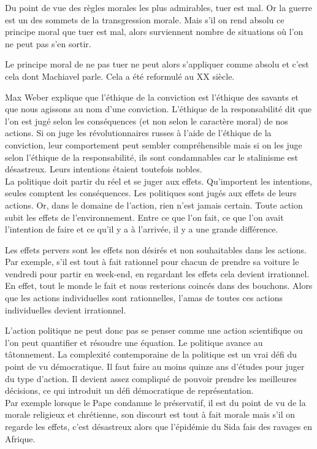 \documentclass[a4paper,11pt]{article}
\begin{document}
	Du point de vue des règles morales les plus admirables, tuer est mal. Or la guerre est un des sommets de la transgression morale. Mais s’il on rend absolu ce principe moral que tuer est mal, alors surviennent nombre de situations où l’on ne peut pas s’en sortir.
	 
	Le principe moral de ne pas tuer ne peut alors s’appliquer comme absolu et c’est cela dont Machiavel parle. Cela a été reformulé au XX siècle.
	
	Max Weber explique que l’éthique de la conviction est l’éthique des savants et que nous agissons au nom d’une conviction. L’éthique de la responsabilité dit que l’on est jugé selon les conséquences (et non selon le caractère moral) de nos actions.
	Si on juge les révolutionnaires russes à l’aide de l’éthique de la conviction, leur comportement peut sembler compréhensible mais si on les juge selon l’éthique de la responsabilité, ils sont condamnables car le stalinisme est désastreux. Leurs intentions étaient toutefois nobles.\\

	
	La politique doit partir du réel et se juger aux effets. Qu’importent les intentions, seules comptent les conséquences. Les politiques sont jugés aux effets de leurs actions. Or, dans le domaine de l’action, rien n’est jamais certain. Toute action subit les effets de l’environnement. Entre ce que l’on fait, ce que l’on avait l’intention de faire et ce qu’il y a à l’arrivée, il y a une grande différence.
	
		Les effets pervers sont les effets non désirés et non souhaitables dans les actions. Par exemple, s’il est tout à fait rationnel pour chacun de prendre sa voiture le vendredi pour partir en week-end, en regardant les effets cela devient irrationnel. En effet, tout le monde le fait et nous resterions coincés dans des bouchons. Alors que les actions individuelles sont rationnelles, l’amas de toutes ces actions individuelles devient irrationnel.
		
		L’action politique ne peut donc pas se penser comme une action scientifique ou l’on peut quantifier et résoudre une équation. Le politique avance au tâtonnement. La complexité contemporaine de la politique est un vrai défi du point de vu démocratique.  Il faut faire au moins quinze ans d’études pour juger du type d’action. Il devient assez compliqué de pouvoir prendre les meilleures décisions, ce qui introduit  un défi démocratique de représentation.\\
	
		
	Par exemple lorsque le Pape condamne le préservatif, il est du point de vu de la morale religieux et chrétienne, son discourt est tout à fait morale mais s’il on regarde les effets, c’est désastreux alors que l’épidémie du Sida fais des ravages en Afrique.\\
	
\end{document}
